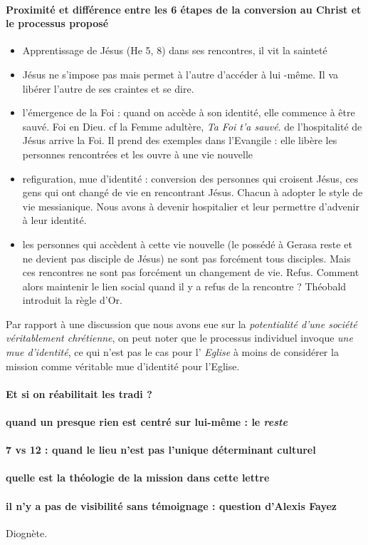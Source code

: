  
 


\paragraph{Proximité et différence entre les 6 étapes de la conversion au Christ et le processus proposé }
\begin{itemize}
    \item Apprentissage de Jésus (He 5, 8) dans ses rencontres, il vit la sainteté

\item Jésus ne s'impose pas mais permet à l'autre d'accéder à lui -même. Il va libérer l'autre de ses craintes et se dire. 
\item l'émergence de la Foi : quand on accède à son identité, elle commence à être sauvé. Foi en Dieu. cf la Femme adultère, \textit{Ta Foi t'a sauvé}. de l'hospitalité de Jésus arrive la Foi. Il prend des exemples dans l'Evangile : elle libère les personnes rencontrées et les ouvre à une vie nouvelle
\item refiguration, mue d'identité : conversion des personnes qui croisent Jésus, ces gens qui ont changé de vie en rencontrant Jésus. Chacun à adopter le style de vie messianique. Nous avons à devenir hospitalier et leur permettre d'advenir à leur identité.
\item les personnes qui accèdent à cette vie nouvelle ({le possédé à Gerasa reste et ne devient pas disciple de Jésus}) ne sont pas forcément tous disciples. Mais ces rencontres ne sont pas forcément un changement de vie. Refus. Comment alors maintenir le lien social quand il y a refus de la rencontre ? 
Théobald introduit la règle d'Or.
\end{itemize}
 Par rapport à une discussion que nous avons eue sur la \textit{potentialité d'une société véritablement chrétienne}, on peut noter que le processus individuel invoque \textit{une mue d'identité}, ce qui n'est pas le cas pour l' \textit{Eglise} à moins de considérer la mission comme véritable mue d'identité pour l'Eglise.


\paragraph{Et si on réabilitait les tradi ? } \paragraph{quand un presque rien est centré sur lui-même  : le \textit{reste}}


\paragraph{7 vs 12 : quand le lieu n'est pas l'unique déterminant culturel }

 
\paragraph{quelle est la théologie de la mission dans cette lettre}


\paragraph{il n'y a pas de visibilité sans témoignage : question d'Alexis Fayez} Diognète. 

 

